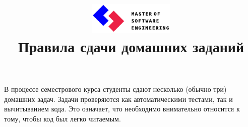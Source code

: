 \documentclass[a4paper,10pt]{article}
\begin{document}


\title{\includegraphics[height=15mm]{../mse-logo}\\[1em]
Правила сдачи домашних заданий}
\preauthor{}
\author{}
\postauthor{}

\maketitle

В процессе семестрового курса студенты сдают несколько (обычно три) домашних
задач. Задачи проверяются как автоматическими тестами, так и вычитыванием кода.
Это означает, что необходимо внимательно относится к тому, чтобы код был легко
читаемым.  
\end{document}
